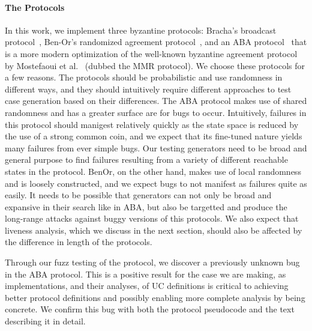 \paragraph{The Protocols}
In this work, we implement three byzantine protocols: Bracha's broadcast protocol~\cite{brachabcast}, Ben-Or's randomized agreement protocol~\cite{benoragreement}, and an ABA protocol~\cite{aba} that is a more modern optimization of the well-known byzantine agreement protocol by Mostefaoui et al.~\cite{mmr} (dubbed the MMR protocol).
We choose these protocols for a few reasons. 
The protocols should be probabilistic and use randomness in different ways, and they should intuitively require different approaches to test case generation based on their differences.
The ABA protocol makes use of shared randomness and has a greater surface are for bugs to occur.
Intuitively, failures in this protocol should manigest relatively quickly as the state space is reduced by the use of a strong common coin, and we expect that its fine-tuned nature yields many failures from ever simple bugs.
Our testing generators need to be broad and general purpose to find failures resulting from a variety of different reachable states in the protocol.
BenOr, on the other hand, makes use of local randomness and is loosely constructed, and we expect bugs to not manifest as failures quite as easily.
It needs to be possible that generators can not only be broad and expansive in their search like in ABA, but also be targetted and produce the long-range attacks against buggy versions of this protocols.
We also expect that liveness analysis, which we discuss in the next section, should also be affected by the difference in length of the protocols.

Through our fuzz testing of the protocol, we discover a previously unknown bug in the ABA protocol.
This is a positive result for the case we are making, as implementations, and their analyses, of UC definitions is critical to achieving better protocol definitions and possibly enabling more complete analysis by being concrete.
We confirm this bug with both the protocol pseudocode and the text describing it in detail.

